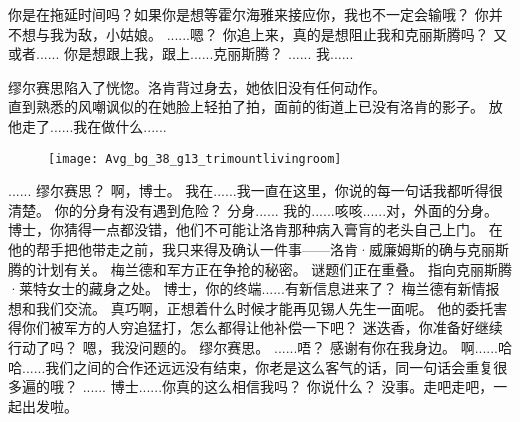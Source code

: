 \documentclass[openany]{book}
\begin{document}
\begin{dialogue}
     你是在拖延时间吗？如果你是想等霍尔海雅来接应你，我也不一定会输哦？
     你并不想与我为敌，小姑娘。
     ......嗯？
     你追上来，真的是想阻止我和克丽斯腾吗？
     又或者......
     你是想跟上我，跟上......克丽斯腾？
     ......
     我......\par
    缪尔赛思陷入了恍惚。洛肯背过身去，她依旧没有任何动作。\\
    直到熟悉的风嘲讽似的在她脸上轻拍了拍，面前的街道上已没有洛肯的影子。
     放他走了......我在做什么......
    \begin{figure}[h]
        \centering
        \texttt{[image: Avg\_bg\_38\_g13\_trimountlivingroom]}
    \end{figure}
     ......
     缪尔赛思？
     啊，博士。
     我在......我一直在这里，你说的每一句话我都听得很清楚。
     你的分身有没有遇到危险？
     分身......
     我的......咳咳......对，外面的分身。
     博士，你猜得一点都没错，他们不可能让洛肯那种病入膏肓的老头自己上门。
     在他的帮手把他带走之前，我只来得及确认一件事——洛肯·威廉姆斯的确与克丽斯腾的计划有关。
     梅兰德和军方正在争抢的秘密。
     谜题们正在重叠。
     指向克丽斯腾·莱特女士的藏身之处。
     博士，你的终端......有新信息进来了？
     梅兰德有新情报想和我们交流。
     真巧啊，正想着什么时候才能再见锡人先生一面呢。
     他的委托害得你们被军方的人穷追猛打，怎么都得让他补偿一下吧？
     迷迭香，你准备好继续行动了吗？
     嗯，我没问题的。
     缪尔赛思。
     ......唔？
     感谢有你在我身边。
     啊......哈哈......我们之间的合作还远远没有结束，你老是这么客气的话，同一句话会重复很多遍的哦？
     ......
     博士......你真的这么相信我吗？
     你说什么？
     没事。走吧走吧，一起出发啦。
\end{dialogue}
\end{document}
